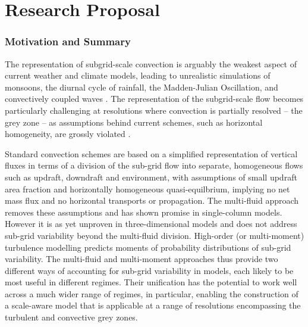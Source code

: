 \documentclass[11pt,a4paper]{article}
\begin{document}


\newpage

\part{Research Proposal}






\section{Motivation and Summary}

The representation of subgrid-scale convection is arguably the weakest aspect of current weather and climate models, leading to unrealistic simulations of monsoons, the diurnal cycle of rainfall, the Madden-Julian Oscillation, and convectively coupled waves  \cite[]{SAB+13,HPB+14}. The representation of the subgrid-scale flow becomes particularly challenging at resolutions where convection is partially resolved -- the grey zone -- as assumptions behind current schemes, such as horizontal homogeneity, are grossly violated \cite[e.g.][]{GG05}.

Standard convection schemes are based on a simplified representation of vertical fluxes in terms of a division of the sub-grid flow into separate, homogeneous flows such as updraft, downdraft and environment, with assumptions of small updraft area fraction and horizontally homogeneous quasi-equilbrium, implying no net mass flux and no horizontal transports or propagation. The multi-fluid approach removes these assumptions and has shown promise in single-column models. However it is as yet unproven in three-dimensional models and does not address sub-grid variability beyond the multi-fluid division. High-order (or multi-moment) turbulence modelling predicts moments of probability distributions of sub-grid variability. The multi-fluid and multi-moment approaches thus provide two different ways of accounting for sub-grid variability in models, each likely to be most useful in different regimes. Their unification has the potential to work well across a much wider range of regimes, in particular, enabling the construction of a scale-aware model that is applicable at a range of resolutions encompassing the turbulent and convective grey zones.
\end{document}
